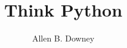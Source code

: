 \documentclass[10pt]{book}
\title{Think Python}
\author{Allen B. Downey}
\newif\ifplastex
\begin{document}
\frontmatter

\ifplastex
    \usepackage{localdef}
    \maketitle

\newcount\anchorcnt
\newcommand*{\Anchor}[1]{%
  \@bsphack%
    \Hy@GlobalStepCount\anchorcnt%
    \edef\@currentHref{anchor.\the\anchorcnt}%
    \Hy@raisedlink{\hyper@anchorstart{\@currentHref}\hyper@anchorend}%
    \M@gettitle{}\label{#1}%
    \@esphack%
}


\else

\newtheorem{exercise}{Exercise}[chapter]



\end{document}
